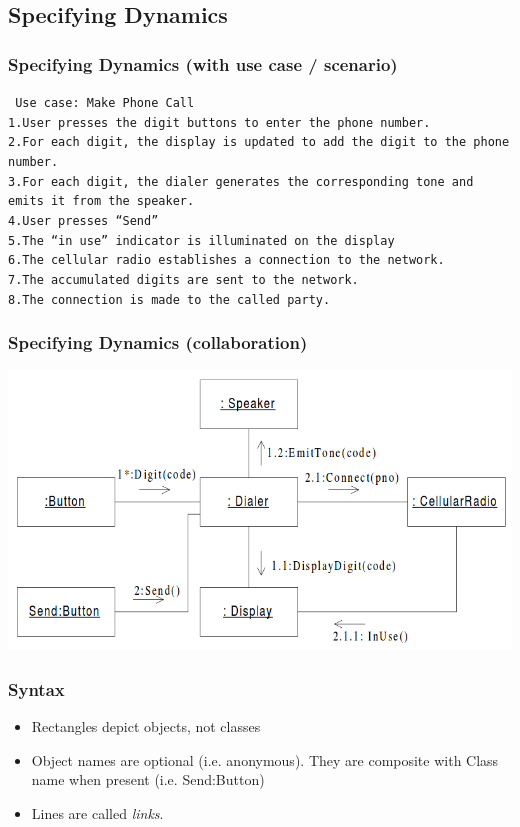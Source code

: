 \documentclass{beamer}
\begin{document}
\subsection{Specifying Dynamics}
\begin{frame}
	\frametitle{Specifying Dynamics (with use case / scenario)}
  		\texttt{
  		Use case: Make Phone Call \\
1.User presses the digit buttons to enter the phone number. \\
2.For each digit, the display is updated to add the digit to the
phone number. \\
3.For each digit, the dialer generates the corresponding tone and
emits it from the speaker. \\
4.User presses ``Send'' \\
5.The ``in use'' indicator is illuminated on the display \\
6.The cellular radio establishes a connection to the network. \\
7.The accumulated digits are sent to the network. \\
8.The connection is made to the called party. \\
  		}
\end{frame}

\begin{frame}
	\frametitle{Specifying Dynamics (collaboration)}
	\begin{center}
		\includegraphics[scale=0.38]{collaboration}
	\end{center}
\end{frame}

\begin{frame}
	\frametitle{Syntax}
	\begin{itemize}
  		\item Rectangles depict objects, not classes
  		\item Object names are optional (i.e. anonymous). They are composite with Class name when present (i.e. Send:Button)
  		\item Lines are called \textit{links}.
	\end{itemize}
\end{frame}
\end{document}

